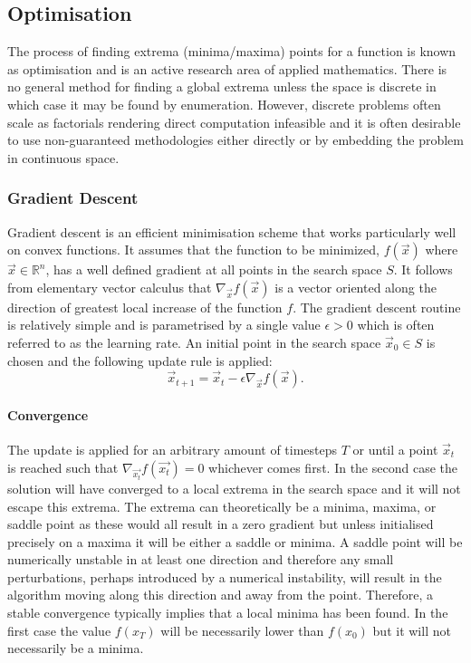 \subsection{Optimisation}
The process of finding extrema (minima/maxima) points for a function is known as optimisation and is an active research area of applied mathematics. There is no general method for finding a global extrema unless the space is discrete in which case it may be found by enumeration. However, discrete problems often scale as factorials rendering direct computation infeasible and it is often desirable to use non-guaranteed methodologies either directly or by embedding the problem in continuous space. 
\subsubsection{Gradient Descent} \label{sec:graddescent}
Gradient descent is an efficient minimisation scheme that works particularly well on convex functions. It assumes that the function to be minimized, $f(\vec{x})$ where $\vec{x} \in \mathbb{R}^n$, has a well defined gradient at all points in the search space $S$. It follows from elementary vector calculus that $\nabla_{\vec{x}} f(\vec{x})$ is a vector oriented along the direction of greatest local increase of the function $f$. The gradient descent routine is relatively simple and is parametrised by a single value $\epsilon > 0$ which is often referred to as the learning rate. An initial point in the search space $\vec{x}_0 \in S$ is chosen and the following update rule is applied:
\begin{equation}
\vec{x}_{t+1} = \vec{x}_t - \epsilon \nabla_{\vec{x}} f(\vec{x}).
\end{equation}
\paragraph{Convergence}
The update is applied for an arbitrary amount of timesteps $T$ or until a point $\vec{x}_{t}$ is reached such that $\nabla_{\vec{x_t}} f(\vec{x_t}) = 0$ whichever comes first. In the second case the solution will have converged to a local extrema in the search space and it will not escape this extrema. The extrema can theoretically be a minima, maxima, or saddle point as these would all result in a zero gradient but unless initialised precisely on a maxima it will be either a saddle or minima. A saddle point will be numerically unstable in at least one direction and therefore any small perturbations, perhaps introduced by a numerical instability, will result in the algorithm moving along this direction and away from the point. Therefore, a stable convergence typically implies that a local minima has been found. In the first case the value $f(x_T)$ will be necessarily lower than $f(x_0)$ but it will not necessarily be a minima.
